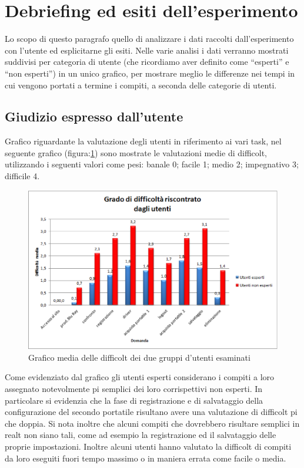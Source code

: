 \section{Debriefing ed esiti dell'esperimento}
Lo scopo di questo paragrafo  quello di analizzare i dati raccolti dall'esperimento con l'utente ed esplicitarne gli esiti. Nelle varie analisi i dati verranno mostrati suddivisi per categoria di utente (che ricordiamo aver definito come ``esperti'' e ``non esperti'') in un unico grafico, per mostrare meglio le differenze nei tempi in cui vengono portati a termine i compiti, a seconda delle categorie di utenti.
\subsection*{Giudizio espresso dall'utente}
Grafico riguardante la valutazione degli utenti in riferimento ai vari task, nel seguente grafico (figura:\ref{fig:grafico_difficolta}) sono mostrate le valutazioni medie di difficolt, utilizzando i seguenti valori come pesi: banale 0; facile 1; medio 2; impegnativo 3; difficile 4.
\begin{figure}[!h]
\centering
\includegraphics[angle=90,scale=0.75]{figure/grafico_difficolta.eps}
\caption{Grafico media delle difficolt dei due gruppi d'utenti esaminati}
\label{fig:grafico_difficolta}
\end{figure}
Come evidenziato dal grafico gli utenti esperti considerano i compiti a loro assegnato notevolmente pi semplici dei loro corrispettivi non esperti. In particolare si evidenzia che la fase di registrazione e di salvataggio della configurazione del secondo portatile risultano avere una valutazione di difficolt pi che doppia. Si nota inoltre che alcuni compiti che dovrebbero risultare semplici in realt non siano tali, come ad esempio la registrazione ed il salvataggio delle proprie impostazioni. Inoltre alcuni utenti hanno valutato la difficolt di compiti da loro eseguiti fuori tempo massimo o in maniera errata come facile o media.


